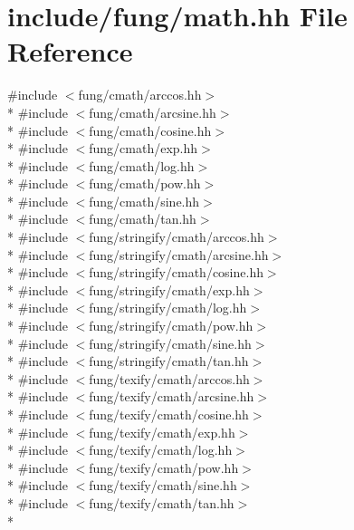 \hypertarget{math_8hh}{\section{include/fung/math.hh File Reference}
\label{math_8hh}
}
{\ttfamily \#include $<$fung/cmath/arccos.\-hh$>$}\\*
{\ttfamily \#include $<$fung/cmath/arcsine.\-hh$>$}\\*
{\ttfamily \#include $<$fung/cmath/cosine.\-hh$>$}\\*
{\ttfamily \#include $<$fung/cmath/exp.\-hh$>$}\\*
{\ttfamily \#include $<$fung/cmath/log.\-hh$>$}\\*
{\ttfamily \#include $<$fung/cmath/pow.\-hh$>$}\\*
{\ttfamily \#include $<$fung/cmath/sine.\-hh$>$}\\*
{\ttfamily \#include $<$fung/cmath/tan.\-hh$>$}\\*
{\ttfamily \#include $<$fung/stringify/cmath/arccos.\-hh$>$}\\*
{\ttfamily \#include $<$fung/stringify/cmath/arcsine.\-hh$>$}\\*
{\ttfamily \#include $<$fung/stringify/cmath/cosine.\-hh$>$}\\*
{\ttfamily \#include $<$fung/stringify/cmath/exp.\-hh$>$}\\*
{\ttfamily \#include $<$fung/stringify/cmath/log.\-hh$>$}\\*
{\ttfamily \#include $<$fung/stringify/cmath/pow.\-hh$>$}\\*
{\ttfamily \#include $<$fung/stringify/cmath/sine.\-hh$>$}\\*
{\ttfamily \#include $<$fung/stringify/cmath/tan.\-hh$>$}\\*
{\ttfamily \#include $<$fung/texify/cmath/arccos.\-hh$>$}\\*
{\ttfamily \#include $<$fung/texify/cmath/arcsine.\-hh$>$}\\*
{\ttfamily \#include $<$fung/texify/cmath/cosine.\-hh$>$}\\*
{\ttfamily \#include $<$fung/texify/cmath/exp.\-hh$>$}\\*
{\ttfamily \#include $<$fung/texify/cmath/log.\-hh$>$}\\*
{\ttfamily \#include $<$fung/texify/cmath/pow.\-hh$>$}\\*
{\ttfamily \#include $<$fung/texify/cmath/sine.\-hh$>$}\\*
{\ttfamily \#include $<$fung/texify/cmath/tan.\-hh$>$}\\*
